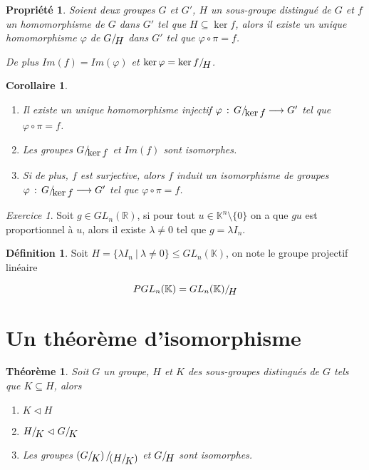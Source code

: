 \documentclass[]{article}
\newtheorem{mythm}{Théorème}
\newtheorem{myproperty}{Propriété}
\newtheorem{mycor}{Corollaire}
\theoremstyle{remark}
\newtheorem{myexer}{Exercice}
\theoremstyle{definition}
\newtheorem{mydef}{Définition}
\newcommand{\funcshort}[3]{
#1 \, : \, #2 \longrightarrow #3
}
\newcommand*{\ClGa}[2]%
{\ensuremath{%
    #1/\!\raisebox{-.65ex}{\ensuremath{#2}}}}
\begin{document}
\begin{myproperty}
	Soient deux groupes $G$ et $G'$, $H$ un sous-groupe distingué de $G$ et $f$ un homomorphisme de $G$ dans $G'$ tel que $H \subseteq \ker f$, alors il existe un unique homomorphisme $\varphi$ de $\ClGa{G}{H}$ dans $G'$ tel que $\varphi \circ \pi = f$.
	
	De plus $Im(f)=Im(\varphi)$ et $\ker \varphi = \ClGa{\ker f}{H}$.
\end{myproperty}

\begin{mycor}
	\leavevmode
	\begin{enumerate}
		\item Il existe un unique homomorphisme injectif $\funcshort{\varphi}{\ClGa{G}{\ker f}}{G'}$ tel que $\varphi \circ \pi = f$.
		
		\item Les groupes $\ClGa{G}{\ker f}$ et $Im(f)$ sont isomorphes.
		
		\item Si de plus, $f$ est surjective, alors $f$ induit un isomorphisme de groupes $\funcshort{\varphi}{\ClGa{G}{\ker f}}{G'}$ tel que $\varphi \circ \pi = f$.
	\end{enumerate}
\end{mycor}

\begin{myexer}
	Soit $g \in GL_n(\mathbb{R})$, si pour tout $u \in \mathbb{K}^n \setminus \{0\}$ on a que $gu$ est proportionnel à $u$, alors il existe $\lambda \neq 0$ tel que $g= \lambda I_n$.
\end{myexer}

\begin{mydef}
	Soit $H = \{\lambda I_n ~ | ~ \lambda \neq 0\} \leqslant GL_n(\mathbb{K})$, on note le groupe projectif linéaire
	
	$$PGL_n(\mathbb{K}) = \ClGa{GL_n(\mathbb{K})}{H}$$
\end{mydef}

\section{Un théorème d'isomorphisme}

\begin{mythm}
	Soit $G$ un groupe, $H$ et $K$ des sous-groupes distingués de $G$ tels que $K \subseteq H$, alors
	
	\begin{enumerate}
		\item $K \vartriangleleft H$
		\item $\ClGa{H}{K} \vartriangleleft \ClGa{G}{K}$
		\item Les groupes $\ClGa{\left(\ClGa{G}{K}\right)}{\left(\ClGa{H}{K}\right)}$ et $\ClGa{G}{H}$ sont isomorphes.
	\end{enumerate}
\end{mythm}
\end{document}

